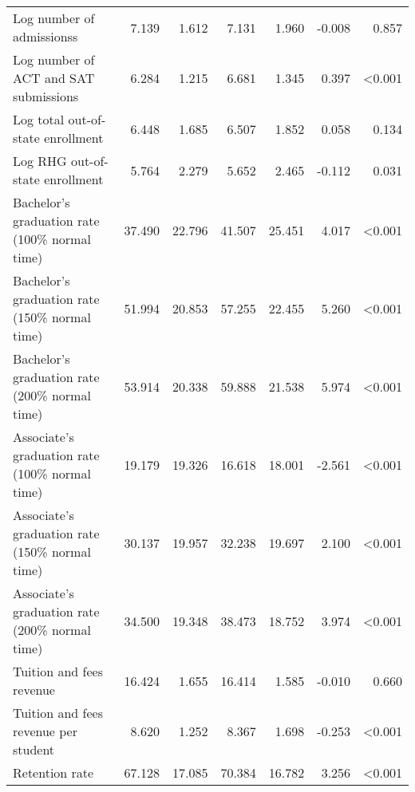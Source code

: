 \begin{table}
\begin{tabular}[t]{lrrrrrr}
Log number of  admissionss & 7.139 & 1.612 & 7.131 & 1.960 & -0.008 & 0.857\\
Log number of ACT and SAT submissions & 6.284 & 1.215 & 6.681 & 1.345 & 0.397 & <0.001\\
Log total out-of-state enrollment & 6.448 & 1.685 & 6.507 & 1.852 & 0.058 & 0.134\\
Log RHG out-of-state enrollment & 5.764 & 2.279 & 5.652 & 2.465 & -0.112 & 0.031\\
Bachelor’s graduation rate (100\% normal time) & 37.490 & 22.796 & 41.507 & 25.451 & 4.017 & <0.001\\
Bachelor’s graduation rate (150\% normal time) & 51.994 & 20.853 & 57.255 & 22.455 & 5.260 & <0.001\\
Bachelor’s graduation rate (200\% normal time) & 53.914 & 20.338 & 59.888 & 21.538 & 5.974 & <0.001\\
Associate’s graduation rate (100\% normal time) & 19.179 & 19.326 & 16.618 & 18.001 & -2.561 & <0.001\\
Associate’s graduation rate (150\% normal time) & 30.137 & 19.957 & 32.238 & 19.697 & 2.100 & <0.001\\
Associate’s graduation rate (200\% normal time) & 34.500 & 19.348 & 38.473 & 18.752 & 3.974 & <0.001\\
Tuition and fees revenue & 16.424 & 1.655 & 16.414 & 1.585 & -0.010 & 0.660\\
Tuition and fees revenue per student & 8.620 & 1.252 & 8.367 & 1.698 & -0.253 & <0.001\\
Retention rate & 67.128 & 17.085 & 70.384 & 16.782 & 3.256 & <0.001\\
\bottomrule
\end{tabular}
\end{table}
